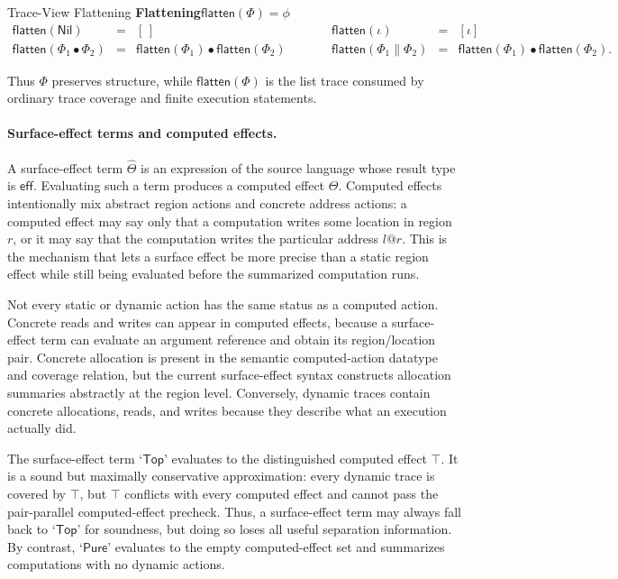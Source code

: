 \documentclass[10pt,a4paper]{article}
\makeatletter
\newcommand{\Top}{\mathsf{Top}}
\newcommand{\Pure}{\mathsf{Pure}}
\newcommand{\Nil}{\mathsf{Nil}}
\newcommand{\tracecat}{\mathbin{\bullet}}
\newcommand{\at}{\mathord{@}}
\newcommand{\thetahat}{\widehat{\Theta}}
\makeatother
\begin{document}
\begin{formalbox}{Trace-View Flattening}
\small
\noindent\textbf{Flattening}\hfill $\boxed{\mathsf{flatten}(\Phi)=\phi}$
\[
\begin{array}{rclcrcl}
\mathsf{flatten}(\Nil) &=& [\,]
&\qquad&
\mathsf{flatten}(\iota) &=& [\iota]\\[0.5mm]
\mathsf{flatten}(\Phi_1\tracecat\Phi_2) &=&
  \mathsf{flatten}(\Phi_1)\tracecat\mathsf{flatten}(\Phi_2)
&\qquad&
\mathsf{flatten}(\Phi_1\parallel\Phi_2) &=&
  \mathsf{flatten}(\Phi_1)\tracecat\mathsf{flatten}(\Phi_2).
\end{array}
\]
\end{formalbox}

Thus $\Phi$ preserves structure, while $\mathsf{flatten}(\Phi)$ is the list
trace consumed by ordinary trace coverage and finite execution statements.

\paragraph{Surface-effect terms and computed effects.}
A surface-effect term $\thetahat$ is an expression of the source language whose
result type is $\mathsf{eff}$. Evaluating such a term produces a computed effect
$\Theta$. Computed effects intentionally mix abstract region actions and
concrete address actions: a computed effect may say only that a computation writes some
location in region $r$, or it may say that the computation writes the particular
address $l\at r$. This is the mechanism that lets a surface effect be more
precise than a static region effect while still being evaluated before the
summarized computation runs.

Not every static or dynamic action has the same status as a computed action.
Concrete reads and writes can appear in computed effects, because a
surface-effect term can evaluate an argument reference and obtain its
region/location pair. Concrete
allocation is present in the semantic computed-action datatype and coverage
relation, but the current surface-effect syntax constructs allocation summaries
abstractly at the region level. Conversely, dynamic traces contain concrete
allocations, reads, and writes because they describe what an execution actually
did.

The surface-effect term `$\Top$' evaluates to the distinguished computed effect
$\top$. It is a sound but maximally conservative approximation: every dynamic
trace is covered by $\top$, but $\top$ conflicts with every computed effect
and cannot pass the pair-parallel computed-effect precheck. Thus, a
surface-effect term may always fall back to `$\Top$' for soundness, but doing so
loses all useful separation information. By contrast, `$\Pure$'
evaluates to the empty computed-effect set and summarizes computations with no
dynamic actions.
\end{document}
